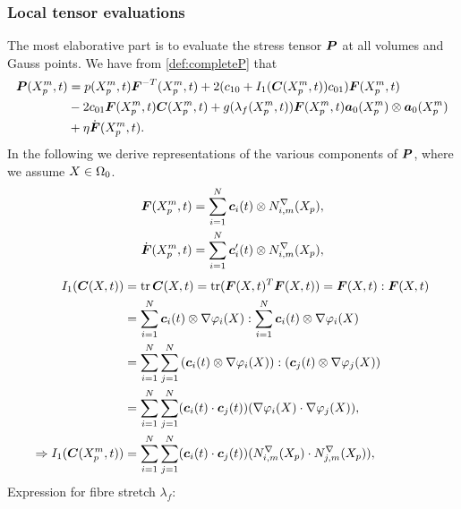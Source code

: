 \subsubsection{Local tensor evaluations}
The most elaborative part is to evaluate the stress tensor $\vP$ at all volumes and Gauss points.
We have from \eqref{def:completeP} that
\begin{align*}
		\vP(\pmp,t) &= p(\pmp,t)\vF^{-T}(\pmp,t) + 2(c_{10} + I_1(\vC(\pmp,t))c_{01})\vF(\pmp,t)\\
			 &- 2c_{01}\vF(\pmp,t)\vC(\pmp,t)+g(\lambda_f(\pmp,t))\vF(\pmp,t)\va_0(\pmp)\otimes\va_0(\pmp)\\
			 & + \eta \dot{\vF}(\pmp,t).
\end{align*}
In the following we derive representations of the various components of $\vP$, where we assume $X\in\Or$.
\begin{align*}
	\vF(\pmp,t) &= \sumi \vc_i(t)\otimes \dNimp,\\
	\dot{\vF}(\pmp,t) &= \sumi \vc_i'(t)\otimes \dNimp,
\end{align*}	
\begin{align}
	I_1(\vC(X,t)) &= \tr\vC(X,t) = \tr(\vF(X,t)^T\vF(X,t)) = \vF(X,t) : \vF(X,t)\nonumber\\
	&= \sumi \vc_i(t)\otimes \dpi : \sumi \vc_i(t)\otimes \dpi\nonumber\\
	&= \sumi\sumj \left(\vc_i(t)\otimes \dpi\right) : (\vc_j(t)\otimes \dpj)\nonumber\\
	&= \sumi\sumj (\vc_i(t) \cdot \vc_j(t))(\dpi \cdot \dpj),\label{eq:I1_basis}\\
	\Rightarrow I_1(\vC(\pmp,t)) &= \sumi\sumj (\vc_i(t) \cdot \vc_j(t))(\dNimp \cdot \dNjmp),\nonumber
\end{align}
Expression for fibre stretch $\lambda_f$:
